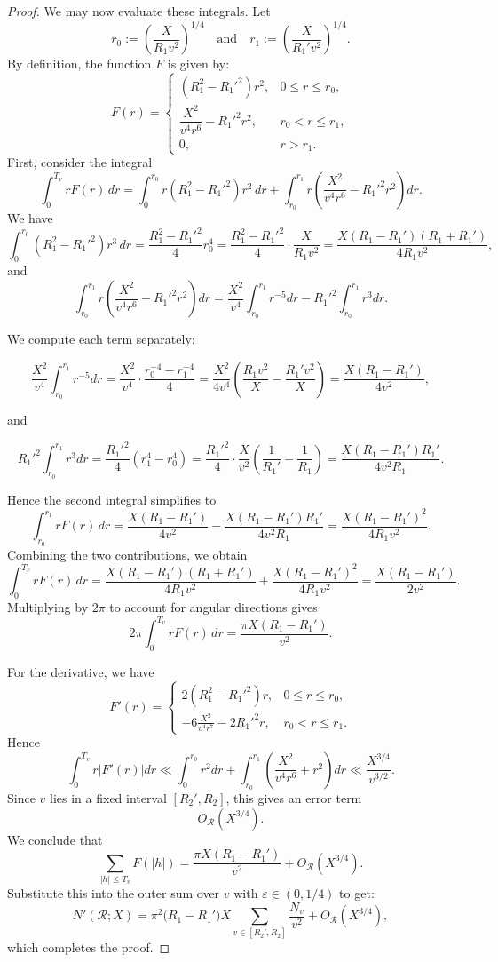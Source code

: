 \documentclass[10pt,a4paper]{amsart}
\begin{document}
\begin{proof}
We may now evaluate these integrals. Let 
\[
r_0 := \left( \frac{X}{R_1 v^2} \right)^{1/4}
\quad\text{and}\quad
r_1 := \left( \frac{X}{R_1' v^2} \right)^{1/4}.
\]
By definition, the function $F$ is given by:
\[
F(r) = 
\begin{cases} 
(R_1^2 - R_1'^2) r^2, & 0 \le r \le r_0,\\[2mm]
\dfrac{X^2}{v^4 r^6} - R_1'^2 r^2, & r_0 < r \le r_1,\\[1mm]
0, & r > r_1.
\end{cases}
\]
First, consider the integral
\[
\int_0^{T_v} r F(r)\, dr 
= \int_0^{r_0} r (R_1^2 - R_1'^2) r^2\, dr 
+ \int_{r_0}^{r_1} r \left( \frac{X^2}{v^4 r^6} - R_1'^2 r^2 \right) dr.
\]
We have
\[
\int_0^{r_0} (R_1^2 - R_1'^2) r^3\, dr = \frac{R_1^2 - R_1'^2}{4} r_0^4 = \frac{R_1^2 - R_1'^2}{4} \cdot \frac{X}{R_1 v^2} = \frac{X (R_1 - R_1')(R_1 + R_1')}{4 R_1 v^2},
\]
and
\[
\int_{r_0}^{r_1} r \left( \frac{X^2}{v^4 r^6} - R_1'^2 r^2 \right) dr
= \frac{X^2}{v^4} \int_{r_0}^{r_1} r^{-5} dr - R_1'^2 \int_{r_0}^{r_1} r^3 dr.
\]

We compute each term separately:

\[
\frac{X^2}{v^4} \int_{r_0}^{r_1} r^{-5} dr = \frac{X^2}{v^4} \cdot \frac{r_0^{-4} - r_1^{-4}}{4} 
= \frac{X^2}{4 v^4} \left( \frac{R_1 v^2}{X} - \frac{R_1' v^2}{X} \right) 
= \frac{X (R_1 - R_1')}{4 v^2},
\]

and

\[
R_1'^2 \int_{r_0}^{r_1} r^3 dr = \frac{R_1'^2}{4} (r_1^4 - r_0^4) 
= \frac{R_1'^2}{4} \cdot \frac{X}{v^2} \left( \frac{1}{R_1'} - \frac{1}{R_1} \right) 
= \frac{X (R_1 - R_1') R_1'}{4 v^2 R_1}.
\]

Hence the second integral simplifies to
\[
\int_{r_0}^{r_1} r F(r)\, dr = \frac{X (R_1 - R_1')}{4 v^2} - \frac{X (R_1 - R_1') R_1'}{4 v^2 R_1} 
= \frac{X (R_1 - R_1')^2}{4 R_1 v^2}.
\]
\noindent Combining the two contributions, we obtain
\[
\int_0^{T_v} r F(r)\, dr = \frac{X (R_1 - R_1')(R_1 + R_1')}{4 R_1 v^2} + \frac{X (R_1 - R_1')^2}{4 R_1 v^2} = \frac{X (R_1 - R_1')}{2 v^2}.
\]
\noindent Multiplying by \(2\pi\) to account for angular directions gives
\[
2\pi \int_0^{T_v} r F(r)\, dr = \frac{\pi X (R_1 - R_1')}{v^2}.
\]

For the derivative, we have
\[
F'(r) = 
\begin{cases} 
2 (R_1^2 - R_1'^2) r, & 0 \le r \le r_0,\\
-6 \frac{X^2}{v^4 r^7} - 2 R_1'^2 r, & r_0 < r \le r_1.
\end{cases}
\]
Hence
\[
\int_0^{T_v} r |F'(r)| dr \ll \int_0^{r_0} r^2 dr + \int_{r_0}^{r_1} \left( \frac{X^2}{v^4 r^6} + r^2 \right) dr \ll \frac{X^{3/4}}{v^{3/2}}.
\]
\noindent Since \(v\) lies in a fixed interval \([R_2', R_2]\), this gives an error term
\[
O_{\mathcal R}(X^{3/4}).
\]
We conclude that
\[
\sum_{|h|\leq T_v} F(|h|) = \frac{\pi X (R_1 - R_1')}{v^2} + O_{\mathcal R}(X^{3/4}).
\]
Substitute this into the outer sum over $v$ with $\varepsilon\in (0, 1/4)$ to get:
\[
N'(\mathcal R;X)
=
\pi^2\bigl(R_1-R_1'\bigr)
X
\sum_{v\in[R_2',R_2]}
\frac{N_v}{v^2}
+
O_{\mathcal R}(X^{3/4}),
\]
which completes the proof.
\end{proof}
\end{document}
